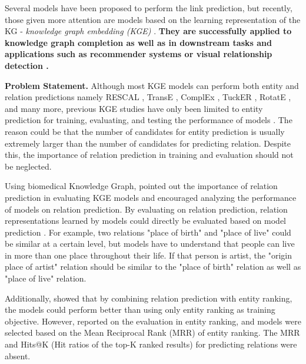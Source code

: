 Several models have been proposed to perform the link prediction, but recently, those given more attention are models based on the learning representation of the KG - \textit{knowledge graph embedding (KGE)} \citep{wang2017knowledge}. \textbf{They are successfully applied to knowledge graph completion \citep{2016} as well as in downstream tasks and applications such as recommender systems \citep{wang2017knowledge} or visual relationship detection \citep{DBLP:conf/semweb/BaierMT17}.}
\newline

\noindent\textbf{Problem Statement.} Although most KGE models can perform both entity and relation predictions \citep{wang2017knowledge} namely RESCAL \citep{nickel2011three}, TransE \citep{bordes2013translating}, ComplEx \citep{trouillon2016complex}, TuckER \citep{balazevic-etal-2019-tucker}, RotatE \citep{sun2019rotate}, and many more, previous KGE studies have only been limited to entity prediction for training, evaluating, and testing the performance of models \citep{yang2014embedding, wang2014knowledge, trouillon2016complex, shang2018endtoend, sun2019rotate}. 
The reason could be that the number of candidates for entity prediction is usually extremely larger than the number of candidates for predicting relation. Despite this, the importance of relation prediction in training and evaluation should not be neglected.

Using biomedical Knowledge Graph, \citet{chang2020benchmark} pointed out the importance of relation prediction in evaluating KGE models and encouraged analyzing the performance of models on relation prediction. By evaluating on relation prediction, relation representations learned by models could directly be evaluated based on model prediction \citep{chang2020benchmark}. For example, two relations "place of birth" and "place of live" could be similar at a certain level, but models have to understand that people can live in more than one place throughout their life. If that person is artist, the "origin place of artist" relation should be similar to the "place of birth" relation as well as "place of live" relation.

Additionally, \citet{chen2021relation} showed that by combining relation prediction with entity ranking, the models could perform better than using only entity ranking as training objective. 
However, \citet{chen2021relation} reported on the evaluation in entity ranking, and models were selected based on the Mean Reciprocal Rank (MRR) of entity ranking. The MRR and Hits@K (Hit ratios of the top-K ranked results) for predicting relations were absent. 
\newline

